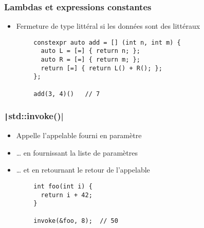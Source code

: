 \documentclass[C++.tex]{subfiles}
\begin{document}
\begin{frame}[fragile]
	\frametitle{Lambdas et expressions constantes}
	\begin{itemize}
		\item Fermeture de type littéral si les données sont des littéraux
	\end{itemize}

	\begin{verbatim}
		constexpr auto add = [] (int n, int m) {
		  auto L = [=] { return n; };
		  auto R = [=] { return m; };
		  return [=] { return L() + R(); };
		};

		add(3, 4)()   // 7
	\end{verbatim}


\end{frame}

\begin{frame}[fragile]
	\frametitle{\texttt|std::invoke()|}
	\begin{itemize}
		\item Appelle l'appelable fourni en paramètre
		\item \ldots{} en fournissant la liste de paramètres
		\item \ldots{} et en retournant le retour de l'appelable
	\end{itemize}

	\begin{verbatim}
		int foo(int i) {
		  return i + 42;
		}

		invoke(&foo, 8);  // 50
	\end{verbatim}

\end{frame}
\end{document}
